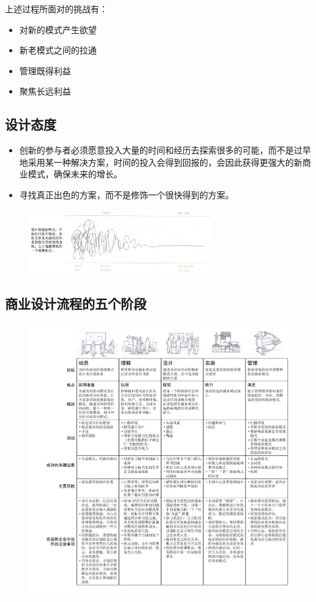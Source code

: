 上述过程所面对的挑战有：
\begin{itemize}
    \item 对新的模式产生欲望
    \item 新老模式之间的拉通
    \item 管理既得利益
    \item 聚焦长远利益
\end{itemize}

\subsection{设计态度}
\begin{itemize}
    \item 创新的参与者必须愿意投入大量的时间和经历去探索很多的可能，而不是过早地采用某一种解决方案，时间的投入会得到回报的，会因此获得更强大的新商业模式，确保未来的增长。
    \item 寻找真正出色的方案，而不是修饰一个很快得到的方案。
\end{itemize}

\begin{figure}[H]
	\centering
	\vspace{-0.5em}
	\includegraphics[width=0.7\textwidth]{img/设计曲线.png}
    \vspace{-0.5em}
\end{figure}

\subsection{商业设计流程的五个阶段}

\begin{figure}[H]
	\centering
	\vspace{-0.5em}
	\includegraphics[width=\textwidth]{img/商业模式设计流程.pdf}
    \vspace{-0.5em}
\end{figure}

